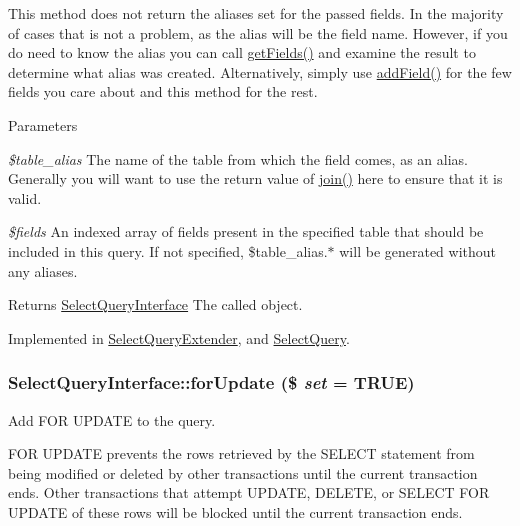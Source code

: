 This method does not return the aliases set for the passed fields. In the majority of cases that is not a problem, as the alias will be the field name. However, if you do need to know the alias you can call \hyperlink{interfaceSelectQueryInterface_abcddf4751e4bd1a166752ea7e645135c}{getFields()} and examine the result to determine what alias was created. Alternatively, simply use \hyperlink{interfaceSelectQueryInterface_a1c8331825723867ceba20436a6ea5ed1}{addField()} for the few fields you care about and this method for the rest.


\begin{DoxyParams}{Parameters}
\item[{\em \$table\_\-alias}]The name of the table from which the field comes, as an alias. Generally you will want to use the return value of \hyperlink{interfaceSelectQueryInterface_a596614bc76873c1487f87d30f892a651}{join()} here to ensure that it is valid. \item[{\em \$fields}]An indexed array of fields present in the specified table that should be included in this query. If not specified, \$table\_\-alias.$\ast$ will be generated without any aliases. \end{DoxyParams}
\begin{DoxyReturn}{Returns}
\hyperlink{interfaceSelectQueryInterface}{SelectQueryInterface} The called object. 
\end{DoxyReturn}


Implemented in \hyperlink{classSelectQueryExtender_a5b4e0bd5f5e383054a8580dd4fbac077}{SelectQueryExtender}, and \hyperlink{classSelectQuery_ab240a4ee46566adaff68b364c7c60699}{SelectQuery}.\hypertarget{interfaceSelectQueryInterface_a723663b3105f06f28c75bd9d16b7a3c7}{
\subsubsection[{forUpdate}]{\setlength{\rightskip}{0pt plus 5cm}SelectQueryInterface::forUpdate (\$ {\em set} = {\ttfamily TRUE})}}
\label{interfaceSelectQueryInterface_a723663b3105f06f28c75bd9d16b7a3c7}
Add FOR UPDATE to the query.

FOR UPDATE prevents the rows retrieved by the SELECT statement from being modified or deleted by other transactions until the current transaction ends. Other transactions that attempt UPDATE, DELETE, or SELECT FOR UPDATE of these rows will be blocked until the current transaction ends.


